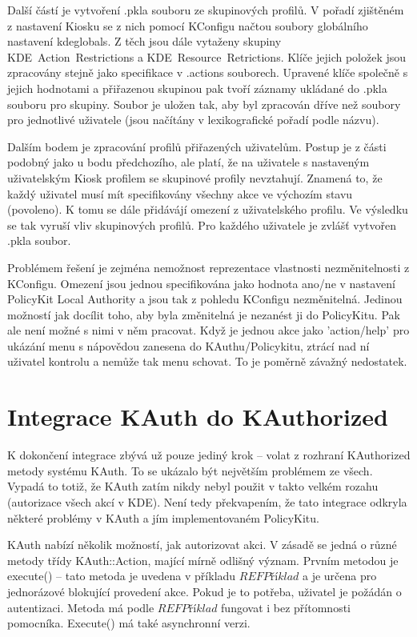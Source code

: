 Další částí je vytvoření .pkla souboru ze skupinových profilů. V pořadí
zjištěném z nastavení Kiosku se z nich pomocí KConfigu načtou soubory globálního
nastavení kdeglobals. Z těch jsou dále vytaženy skupiny KDE~Action~Restrictions
a KDE~Resource~Retrictions. Klíče jejich položek jsou zpracovány stejně jako
specifikace v .actions souborech. Upravené klíče společně s jejich hodnotami
a přiřazenou skupinou pak tvoří záznamy ukládané do .pkla souboru pro skupiny.
Soubor je uložen tak, aby byl zpracován dříve než soubory pro jednotlivé
uživatele (jsou načítány v lexikografické pořadí podle názvu).

Dalším bodem je zpracování profilů přiřazených uživatelům. Postup je z části
podobný jako u bodu předchozího, ale platí, že na uživatele s nastaveným
uživatelským Kiosk profilem se skupinové profily nevztahují. Znamená to, že
každý uživatel musí mít specifikovány všechny akce ve výchozím stavu (povoleno).
K tomu se dále přidávájí omezení z uživatelského profilu. Ve výsledku se tak
vyruší vliv skupinových profilů. Pro každého uživatele je zvlášť vytvořen .pkla
soubor.

Problémem řešení je zejména nemožnost reprezentace vlastnosti nezměnitelnosti
z KConfigu. Omezení jsou jednou specifikována jako hodnota ano/ne v nastavení
PolicyKit Local Authority a jsou tak z pohledu KConfigu nezměnitelná. Jedinou
možností jak docílit toho, aby byla změnitelná je nezanést ji do PolicyKitu.
Pak ale není možné s nimi v něm pracovat. Když je jednou akce jako 'action/help'
pro ukázání menu s nápovědou zanesena do KAuthu/Policykitu, ztrácí nad ní
uživatel kontrolu a nemůže tak menu schovat. To je poměrně závažný nedostatek.

\section{Integrace KAuth do KAuthorized}
K dokončení integrace zbývá už pouze jediný krok -- volat z rozhraní KAuthorized
metody systému KAuth. To se ukázalo být největším problémem ze všech. Vypadá to
totiž, že KAuth zatím nikdy nebyl použit v takto velkém rozahu (autorizace všech
akcí v KDE). Není tedy překvapením, že tato integrace odkryla některé problémy
v KAuth a jím implementovaném PolicyKitu.

KAuth nabízí několik možností, jak autorizovat akci. V zásadě se jedná o různé
metody třídy KAuth::Action, mající mírně odlišný význam. Prvním metodou
je execute() -- tato metoda je uvedena v příkladu $REF Příklad$ a je určena pro
jednorázové blokující provedení akce. Pokud je to potřeba, uživatel je požádán
o autentizaci. Metoda má podle $REF Příklad$ fungovat i bez přítomnosti
pomocníka. Execute() má také asynchronní verzi.

